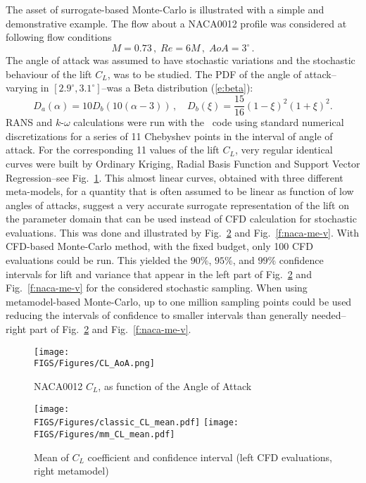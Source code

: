 \documentclass{eurosae}
\newcommand{\lift}{C_L}
\newcommand{\Mach}{M}
\newcommand{\fref}[1]{Fig.~\ref{#1}}
\begin{document}
The asset of surrogate-based Monte-Carlo is illustrated with a simple and demonstrative example. The flow about a  NACA0012 profile was considered at following flow conditions 
%
$$\Mach=0.73\,,\;Re=6M\,,\;AoA=3^\circ\,.$$
%
 The angle of attack was assumed to have stochastic variations and the stochastic behaviour of the lift $\lift$,
 was to be studied. The PDF of the angle of attack--varying in $[2.9^\circ, 3.1^\circ]$--was a Beta distribution (\ref{e:beta}): 
%
  $$ D_a(\alpha) =10 D_b(10(\alpha-3))\,,\quad D_b(\xi) =\frac{15}{16}(1-\xi)^2(1+\xi)^2. $$
%
RANS and $k$-$\omega$ calculations were run with the \elsA\ code \cite{CamHeiPlo_13} using standard numerical discretizations 
 for a series of 11 Chebyshev points in the interval of angle of attack. For the corresponding 11 values of the lift $\lift$,
 very regular identical curves were built by Ordinary Kriging, Radial Basis Function and Support Vector Regression--see \fref{f:naca-meta}. This almost linear curves, obtained with three different meta-models, for a quantity that is often
 assumed to be linear as function of low angles of attacks, suggest a very accurate surrogate representation of the lift
 on the parameter domain that can be used instead of CFD calculation for stochastic evaluations. This was done
 and illustrated by \fref{f:naca-me-m} and \fref{f:naca-me-v}. With CFD-based Monte-Carlo method, with the fixed budget, only 100 CFD evaluations could be run.
  This yielded the $90\%$, $95\%$, and $99\%$ confidence intervals for lift 
and variance that appear in the left part of \fref{f:naca-me-m} and \fref{f:naca-me-v} for the considered stochastic sampling. When using metamodel-based 
 Monte-Carlo, up to one million sampling points could be used reducing the intervals of confidence to smaller intervals than generally needed--right part of \fref{f:naca-me-m} and \fref{f:naca-me-v}.
%
%
\begin{figure}[!h]
\begin{center}
\texttt{[image: \\FIGS/Figures/CL\_AoA.png]}
\end{center}
\caption{NACA0012 $\lift$, as function of the Angle of Attack}
\label{f:naca-meta}
\end{figure}
%
%
\begin{figure}[!h]
\begin{center}
\texttt{[image: \\FIGS/Figures/classic\_CL\_mean.pdf]} \hspace{10mm}
\texttt{[image: \\FIGS/Figures/mm\_CL\_mean.pdf]}
\end{center}
\caption{Mean of $\lift$ coefficient and confidence interval (left CFD evaluations, right metamodel)}
\label{f:naca-me-m}
\end{figure}
\end{document}
